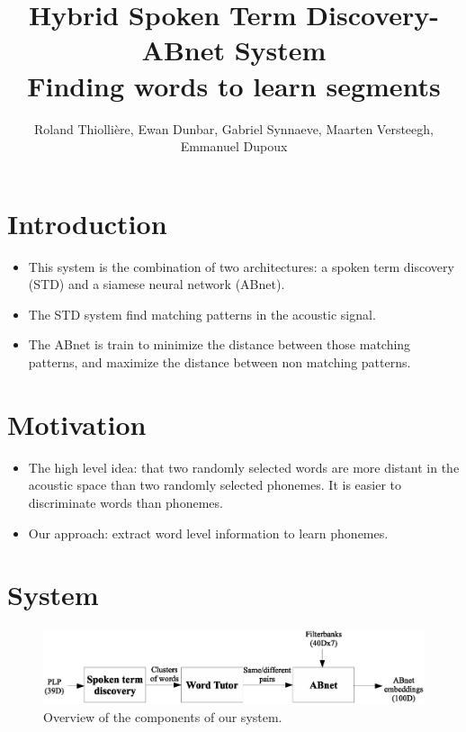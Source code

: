 \documentclass[final]{beamer}
\title
[Interspeech (2015, Dresden, Germany)] %
{ %
Hybrid Spoken Term Discovery-ABnet System\\
Finding words to learn segments
}
\author{ %
Roland Thiolli\`ere\inst{*}, Ewan Dunbar\inst{*}, Gabriel Synnaeve\inst{*\dagger}, Maarten Versteegh\inst{*}, Emmanuel Dupoux\inst{*}
}
\institute
[ENS] %
{
\inst{*} LSCP, \'{E}cole Normale Sup\'{e}rieure / EHESS / CNRS, Paris, France\\%
\inst{\dagger} now at Facebook AI Research\\[0.5ex]
\inst{} \begin{small}\texttt{rolthiolliere@gmail.com, emd@umd.edu, gabrielsynnaeve@gmail.com, maartenversteegh@gmail.com, emmanuel.dupoux@gmail.com}\end{small}
}
\newcommand{\abnet}{{\sc ABnet}}
\begin{document}
\begin{frame}[t]
\begin{multicols}{3} %

\section{Introduction}

\begin{itemize}
\item This system is the combination of two architectures: a spoken term discovery\cite{jansenvandurme2011} (STD) and a siamese neural network\cite{synnaevedupoux2014} (\abnet{}).
\item The STD system find matching patterns in the acoustic signal.
\item The \abnet{} is train to minimize the distance between those matching patterns, and maximize the distance between non matching patterns.
\end{itemize}



\section{Motivation}

\begin{itemize}
\item The high level idea: that two randomly selected words are more distant in the acoustic space than two randomly selected phonemes. It is easier to discriminate words than phonemes.
\item Our approach: extract word level information to learn phonemes.
\end{itemize}


\section{System}

\begin{figure}[ht!]
  \begin{center}
    \includegraphics[width=\columnwidth]{system}
    \caption{\label{fig:system}Overview of the components of our system.}
  \end{center}
\end{figure}


\end{multicols}
\end{frame}
\end{document}
